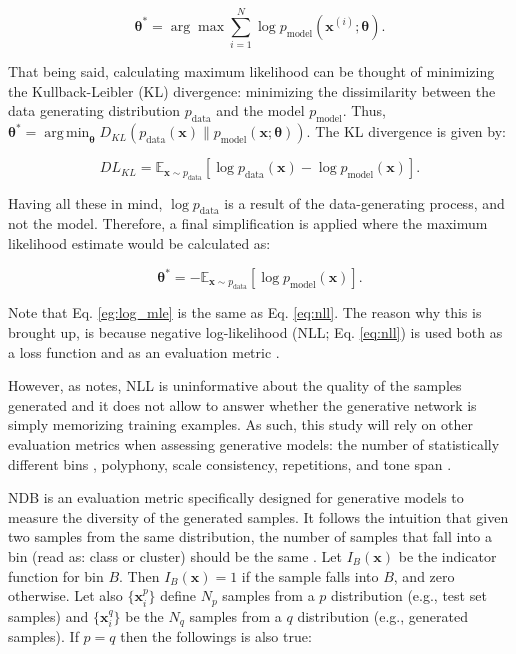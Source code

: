\documentclass[a4paper]{book}
\DeclareMathOperator*{\argmin}{arg\,min}
\begin{document}
\begin{equation}
    \bm{\theta^*} = \arg \max \sum_{i=1}^N \log p_{\text{model}}(\bm{x}^{(i)}; \bm{\theta}) \label{eg:log_mle}.
\end{equation}

That being said, calculating maximum likelihood can be thought of minimizing the Kullback-Leibler (KL) divergence: minimizing the dissimilarity between the data generating distribution $p_{\text{data}}$ and the model $p_{\text{model}}$. Thus, $\bm{\theta^*} = \argmin_{\bm{\theta}} D_{KL}(p_{\text{data}}(\bm{x}) \| p_{\text{model}} (\bm{x}; \bm{\theta}))$. The KL divergence is given by:

\begin{equation}
    DL_{KL} = \mathbb{E}_{\mathbf{x} \sim p_{\text{data}}} [\log p_{\text{data}} (\bm{x}) - \log p_{\text{model}} (\bm{x})] \label{eq:kl_div}.
\end{equation}

Having all these in mind, $\log p_{\text{data}}$ is a result of the data-generating process, and not the model. Therefore, a final simplification is applied where the maximum likelihood estimate would be calculated as:

\begin{equation}
    \bm{\theta^*} = - \mathbb{E}_{\mathbf{x} \sim p_{\text{data}}} [\log p_{\text{model}} (\bm{x})] \label{eq:nll}.
\end{equation}

Note that Eq. \ref{eg:log_mle} is the same as Eq. \ref{eq:nll}. The reason why this is brought up, is because negative log-likelihood (NLL; Eq. \ref{eq:nll}) is used both as a loss function and as an evaluation metric \parencite[also for generative models;][]{yu_seqgan_2016, borji_pros_2018}.

However, as \textcite{borji_pros_2018} notes, NLL is uninformative about the quality of the samples generated and it does not allow to answer whether the generative network is simply memorizing training examples. As such, this study will rely on other evaluation metrics when assessing generative models: the number of statistically different bins \parencite[NDB;][]{richardson_gans_2018}, polyphony, scale consistency, repetitions, and tone span \parencite{mogren_c-rnn-gan_2016}.

NDB is an evaluation metric specifically designed for generative models to measure the diversity of the generated samples. It follows the intuition that given two samples from the same distribution, the number of samples that fall into a bin (read as: class or cluster) should be the same \parencite{richardson_gans_2018}. Let $I_B(\mathbf{x})$ be the indicator function for bin $B$. Then $I_B(\mathbf{x}) = 1$ if the sample falls into $B$, and zero otherwise. Let also $\{\mathbf{x}_i^p\}$ define $N_p$ samples from a $p$ distribution (e.g., test set samples) and $\{\mathbf{x}_i^q\}$ be the $N_q$ samples from a $q$ distribution (e.g., generated samples). If $p = q$ then the followings is also true:
\end{document}
